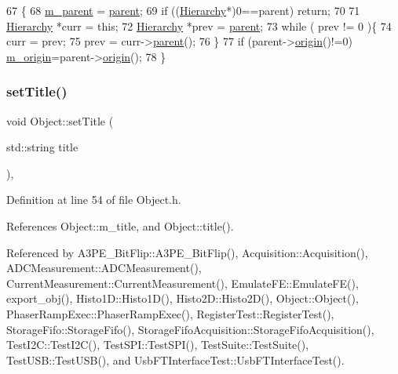 \begin{DoxyCode}
67                                               \{
68   \hyperlink{classHierarchy_a5814bb280d4e8539ab25ab6cbfb9cc4f}{m\_parent} = \hyperlink{classHierarchy_a1c7bec8257e717f9c1465e06ebf845fc}{parent};
69   \textcolor{keywordflow}{if} ((\hyperlink{classHierarchy}{Hierarchy}*)0==parent) \textcolor{keywordflow}{return};
70 
71   \hyperlink{classHierarchy}{Hierarchy} *curr = \textcolor{keyword}{this};
72   \hyperlink{classHierarchy}{Hierarchy} *prev = \hyperlink{classHierarchy_a1c7bec8257e717f9c1465e06ebf845fc}{parent};
73   \textcolor{keywordflow}{while} ( prev != 0 )\{
74     curr = prev;
75     prev = curr->\hyperlink{classHierarchy_a1c7bec8257e717f9c1465e06ebf845fc}{parent}();
76   \}
77   \textcolor{keywordflow}{if} (parent->\hyperlink{classHierarchy_aee461dc930ce3871636ff87f075b1b83}{origin}()!=0) \hyperlink{classHierarchy_a16c73e557d3a7c156ffb5dc4102d148e}{m\_origin}=parent->\hyperlink{classHierarchy_aee461dc930ce3871636ff87f075b1b83}{origin}();
78 \}
\end{DoxyCode}
\mbox{\label{classObject_a89557dbbad5bcaa02652f5d7fa35d20f}} 
\subsubsection{\texorpdfstring{set\+Title()}{setTitle()}}
{\footnotesize\ttfamily void Object\+::set\+Title (\begin{DoxyParamCaption}\item[{std\+::string}]{title }\end{DoxyParamCaption})\hspace{0.3cm}{\ttfamily [inline]}, {\ttfamily [inherited]}}



Definition at line 54 of file Object.\+h.



References Object\+::m\+\_\+title, and Object\+::title().



Referenced by A3\+P\+E\+\_\+\+Bit\+Flip\+::\+A3\+P\+E\+\_\+\+Bit\+Flip(), Acquisition\+::\+Acquisition(), A\+D\+C\+Measurement\+::\+A\+D\+C\+Measurement(), Current\+Measurement\+::\+Current\+Measurement(), Emulate\+F\+E\+::\+Emulate\+F\+E(), export\+\_\+obj(), Histo1\+D\+::\+Histo1\+D(), Histo2\+D\+::\+Histo2\+D(), Object\+::\+Object(), Phaser\+Ramp\+Exec\+::\+Phaser\+Ramp\+Exec(), Register\+Test\+::\+Register\+Test(), Storage\+Fifo\+::\+Storage\+Fifo(), Storage\+Fifo\+Acquisition\+::\+Storage\+Fifo\+Acquisition(), Test\+I2\+C\+::\+Test\+I2\+C(), Test\+S\+P\+I\+::\+Test\+S\+P\+I(), Test\+Suite\+::\+Test\+Suite(), Test\+U\+S\+B\+::\+Test\+U\+S\+B(), and Usb\+F\+T\+Interface\+Test\+::\+Usb\+F\+T\+Interface\+Test().


